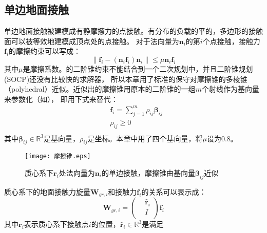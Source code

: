 \subsection{单边地面接触}
单边地面接触被建模成有静摩擦力的点接触。有分布的负载的平的，多边形的接触面可以被等效地建模成顶点处的点接触。
对于法向量为${{\boldsymbol{n}}_{i}}$的第$i$个点接触，接触力${{\boldsymbol{f}}_{i}}$的摩擦约束可以写成：
\begin{equation}
    \label{equ:friction_cone}
    \left\| {{\boldsymbol{f}}_{i}}-({{\boldsymbol{n}}_{i}}{{\boldsymbol{f}}_{i}}){{\boldsymbol{n}}_{i}} \right\|\le \mu {{\boldsymbol{n}}_{i}}{{\boldsymbol{f}}_{i}}
\end{equation}
其中$\mu$是摩擦系数。的二阶锥约束不能结合到一个二次规划中，并且二阶锥规划(SOCP)还没有比较快的求解器，
所以本章用了标准的保守对摩擦锥的多棱锥（polyhedral）近似。近似出的摩擦锥用原本的二阶锥的一组$m$个射线作为基向量来参数化（如），
即用下式来替代：
\begin{equation}
    \label{equ:friction_para}
    \begin{aligned}
        & {{\boldsymbol{f}}_{i}}=\sum\limits_{j=1}^{m}{{{\rho }_{ij}}{{\boldsymbol{\beta}}_{ij}}} \\ 
       & {{\rho }_{ij}}\ge 0 \\ 
      \end{aligned}      
\end{equation}
其中$\boldsymbol{\beta}_{ij} \in \mathbb{R}^3$是基向量，$\rho_{ij}$是坐标。本章中用了四个基向量，将$\mu$设为0.8。
\begin{figure}[htbp]
    \centering
    \texttt{[image: 摩擦锥.eps]}
    \caption{\label{fig:friction_cone}质心系下$\boldsymbol{r}_{i}$处法向量为${{\boldsymbol{n}}_{i}}$的单边接触，摩擦锥由基向量$\boldsymbol{\beta}_{ij}$近似}
\end{figure}
质心系下的地面接触力旋量${{\boldsymbol{W}}_{gr,i}}$和接触力${{\boldsymbol{f}}_{i}}$的关系可以表示成：
\begin{equation}
    \label{equ:contact_wrench}
    {\boldsymbol{W}_{gr,i}}=\left( \begin{aligned}
        & {{{\hat{\boldsymbol{r}}}}_{i}} \\ 
       & I \\ 
      \end{aligned} \right){\boldsymbol{f}_{i}}      
\end{equation}
其中${\boldsymbol{r}_{i}}$表示质心系下接触点$i$的位置，${{\hat{\boldsymbol{r}}}_{i}}\in {{\mathbb{R}}^{3}}$是满足
